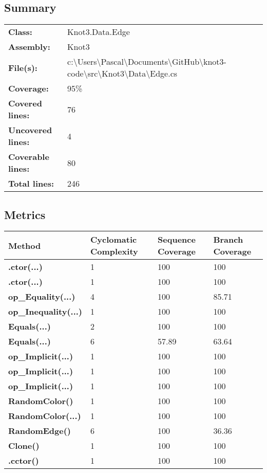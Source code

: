 \documentclass[a4paper,10pt]{article}
\begin{document}
\subsection{Summary}
\begin{longtable}[l]{ll}
\textbf{Class:} & Knot3.Data.Edge\\
\textbf{Assembly:} & Knot3\\
\textbf{File(s):} & \begin{minipage}[t]{12cm}{c:\textbackslash Users\textbackslash Pascal\textbackslash Documents\textbackslash GitHub\textbackslash knot3-code\textbackslash src\textbackslash Knot3\textbackslash Data\textbackslash Edge.cs}\end{minipage} \\
\textbf{Coverage:} & 95\%\\
\textbf{Covered lines:} & 76\\
\textbf{Uncovered lines:} & 4\\
\textbf{Coverable lines:} & 80\\
\textbf{Total lines:} & 246\\
\end{longtable}
\subsection{Metrics}
\begin{longtable}[l]{|l|l|l|l|}
\hline
\textbf{Method} & \textbf{Cyclomatic Complexity} & \textbf{Sequence Coverage} & \textbf{Branch Coverage}\\
\hline
\textbf{.ctor(...)} & 1 & 100 & 100\\
\hline
\textbf{.ctor(...)} & 1 & 100 & 100\\
\hline
\textbf{op\_Equality(...)} & 4 & 100 & 85.71\\
\hline
\textbf{op\_Inequality(...)} & 1 & 100 & 100\\
\hline
\textbf{Equals(...)} & 2 & 100 & 100\\
\hline
\textbf{Equals(...)} & 6 & 57.89 & 63.64\\
\hline
\textbf{op\_Implicit(...)} & 1 & 100 & 100\\
\hline
\textbf{op\_Implicit(...)} & 1 & 100 & 100\\
\hline
\textbf{op\_Implicit(...)} & 1 & 100 & 100\\
\hline
\textbf{RandomColor()} & 1 & 100 & 100\\
\hline
\textbf{RandomColor(...)} & 1 & 100 & 100\\
\hline
\textbf{RandomEdge()} & 6 & 100 & 36.36\\
\hline
\textbf{Clone()} & 1 & 100 & 100\\
\hline
\textbf{.cctor()} & 1 & 100 & 100\\
\hline
\end{longtable}
\end{document}
